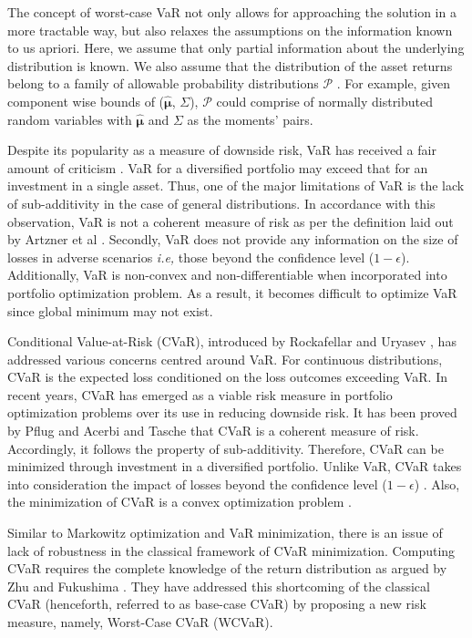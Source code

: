 \documentclass[12pt]{article}
\numberwithin{equation}{section}
\begin{document}
The concept of worst-case VaR not only allows for approaching the solution in a more tractable way, but also relaxes the assumptions on the information known to us apriori. Here, we assume that only partial information about the underlying distribution is known. We also assume that the distribution of the asset returns belong to a family of allowable probability distributions $\mathcal{P}$ \cite{ghaoui03}. For example, given component wise bounds of ($\hat{\boldsymbol{\mu}}$,  $\Sigma$), $\mathcal{P}$ could comprise of normally distributed random variables with $\hat{\boldsymbol{\mu}}$ and $\Sigma$ as the moments' pairs.


Despite its popularity as a measure of downside risk, VaR has received a fair amount of criticism \cite{capinski_risk,zhu,lim}. VaR for a diversified portfolio may exceed that for an investment in a single asset. Thus, one of the major limitations of VaR is the lack of sub-additivity in the case of general distributions. In accordance with this observation, VaR is not a coherent measure of risk as per the definition laid out by Artzner et al \cite{artzner}. Secondly, VaR does not provide any information on the size of losses in adverse scenarios \textit{i.e,} those beyond the confidence level ($1-\epsilon$). Additionally, VaR is non-convex and non-differentiable when incorporated into portfolio optimization problem. As a result, it becomes difficult to optimize VaR since global minimum may not exist. 

Conditional Value-at-Risk (CVaR), introduced by Rockafellar and Uryasev \cite{rockafellar1,rockafellar2}, has addressed various concerns centred around VaR. For continuous distributions, CVaR is the expected loss conditioned on the loss outcomes exceeding VaR. In recent years, CVaR has emerged as a viable risk measure in portfolio optimization problems over its use in reducing downside risk. It has been proved by Pflug \cite{pflug} and Acerbi and Tasche \cite{acerbi} that CVaR is a coherent measure of risk. Accordingly, it follows the property of sub-additivity. Therefore, CVaR can be minimized through investment in a diversified portfolio. Unlike VaR, CVaR takes into consideration the impact of losses beyond the confidence level ($1-\epsilon$) \cite{capinski_risk}. Also, the minimization of CVaR is a convex optimization problem \cite{lim}.

Similar to Markowitz optimization and VaR minimization, there is an issue of lack of robustness in the classical framework of CVaR minimization. Computing CVaR requires the complete knowledge of the return distribution as argued by Zhu and Fukushima \cite{zhu}. They have addressed this shortcoming of the classical CVaR (henceforth, referred to as base-case CVaR) by proposing a new risk measure, namely, Worst-Case CVaR (WCVaR). 
\end{document}
